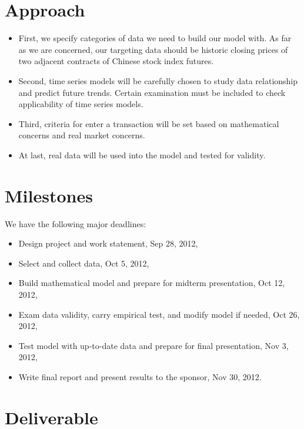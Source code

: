\documentclass[12pt,letterpaper]{article}
\theoremstyle{definition}
\begin{document}
\section{Approach}
\begin{itemize}
    \item 	First, we specify categories of data we need to build our model with. As far as we are concerned, our targeting data should be historic closing prices of two adjacent contracts of Chinese stock index futures.  
    \item 	Second, time series models will be carefully chosen to study data relationship and predict future trends. Certain examination must be included to check applicability of time series models.
    \item 	Third, criteria for enter a transaction will be set based on mathematical concerns and real market concerns.
    \item   At last, real data will be used into the model and tested for validity.
    
\end{itemize}
\section{Milestones}
We have the following major deadlines:
\begin{itemize}
    \item Design project and work statement, Sep 28, 2012,
    \item Select and collect data, Oct 5, 2012,
    \item Build mathematical model and prepare for midterm presentation, Oct 12, 2012,
    \item Exam data validity, carry empirical test, and modify model if needed, Oct 26, 2012,
    \item Test model with up-to-date data and prepare for final presentation, Nov 3, 2012,
    \item Write final report and present results to the sponsor, Nov 30, 2012.
\end{itemize}

\section{Deliverable}
\end{document}
